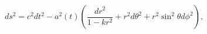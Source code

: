\begin{equation}
ds^2=c^2dt^2-a^2(t)(\frac{dr^2}{1-kr^2}+r^2d\theta ^2+r^2\sin
^2\theta d\phi ^2),  \label{frw}
\end{equation}

